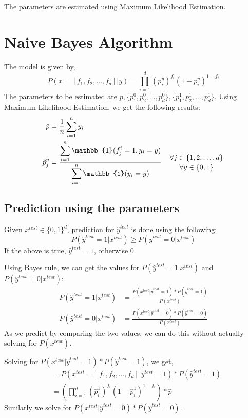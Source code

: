 \documentclass[
]{article}
\begin{document}
The parameters are estimated using Maximum Likelihood Estimation.

\hypertarget{naive-bayes-algorithm}{%
\section{Naive Bayes Algorithm}\label{naive-bayes-algorithm}}

The model is given by, \[
P(x = [f_1, f_2, \ldots, f_d]|y) = \prod_{i=1}^d(p^y_i)^{f_i}(1-p^y_i)^{1-f_i}
\] The parameters to be estimated are
\(p,\{p^0_1,p^0_2,\ldots,p^0_d\},\{p^1_1,p^1_2,\ldots,p^1_d\}\). Using
Maximum Likelihood Estimation, we get the following results:
\begin{align*}
\hat{p}&=\frac{1}{n}\sum_{i=1}^ny_i\\
\hat{p}^y_j &= \frac{\displaystyle \sum_{i=1}^n\mathbb{1}(f^i_j=1,y_i=y)}{\displaystyle \sum_{i=1}^n\mathbb{1}(y_i=y)} \hspace{1em} \genfrac{}{}{0pt}{}{\forall j \in\{1,2,\ldots,d\}}{\forall y \in \{0,1\}} 
\end{align*}

\hypertarget{prediction-using-the-parameters}{%
\subsection{Prediction using the
parameters}\label{prediction-using-the-parameters}}

Given \(x^{test}\in\{0,1\}^d\), prediction for \(\hat{y}^{test}\) is
done using the following: \[
P(\hat{y}^{test}=1|x^{test}) \ge P(\hat{y}^{test}=0|x^{test})
\] If the above is true, \(\hat{y}^{test}=1\), otherwise \(0\).

Using Bayes rule, we can get the values for
\(P(\hat{y}^{test}=1|x^{test})\) and \(P(\hat{y}^{test}=0|x^{test})\):
\begin{align*}
P(\hat{y}^{test}=1|x^{test})&=\frac{P(x^{test}|\hat{y}^{test}=1)*P(\hat{y}^{test}=1)}{P(x^{test})}\\
P(\hat{y}^{test}=0|x^{test})&=\frac{P(x^{test}|\hat{y}^{test}=0)*P(\hat{y}^{test}=0)}{P(x^{test})}
\end{align*} As we predict by comparing the two values, we can do this
without actually solving for \(P(x^{test})\).

Solving for \(P(x^{test}|\hat{y}^{test}=1)*P(\hat{y}^{test}=1)\), we
get, \begin{align*}
&=P(x^{test} = [f_1, f_2, \ldots, f_d]|y^{test}=1)*P(\hat{y}^{test}=1)\\
&=\left(\prod_{i=1}^d(\hat{p}^1_i)^{f_i}(1-\hat{p}^1_i)^{1-f_i}\right)*\hat{p}
\end{align*} Similarly we solve for
\(P(x^{test}|\hat{y}^{test}=0)*P(\hat{y}^{test}=0)\).
\end{document}
